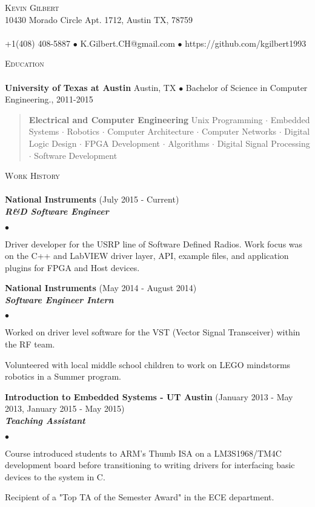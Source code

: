 \documentclass[11pt]{article}
\newcommand{\area}[2]{\vspace*{-9pt} \begin{verse}\textbf{#1}   #2 \end{verse}  }
\newcommand{\lineunder}{\vspace*{-8pt} \\ \hspace*{-18pt} \hrulefill \\}
\newcommand{\header}[1]{{\hspace*{-10pt}\vspace*{6pt} \textsc{#1}} \vspace*{-6pt} \lineunder}
\newcommand{\employer}[3]{{ \textbf{#1} (#2)\\ \textbf{\emph{#3}}}\\  }
\newcommand{\contact}[3]{
\vspace*{-8pt}
\begin{center}
{\LARGE \scshape {#1}}\\
#2 \lineunder 
#3
\end{center}
\vspace*{-8pt}
}
\newenvironment{achievements}{\begin{list}{$\bullet$}{\topsep 0pt \itemsep -2pt}}{\vspace*{4pt}\end{list}}
\newcommand{\schoolwithcourses}[4]{
 \textbf{#1} #2 $\bullet$ #3\\ 
\vspace*{5pt}
}
\begin{document}
\small
\smallskip
\vspace*{-30pt}

\contact{Kevin Gilbert}
{10430 Morado Circle Apt. 1712, Austin TX, 78759}
{+1(408) 408-5887 $\bullet$ K.Gilbert.CH@gmail.com  $\bullet$ https://github.com/kgilbert1993}

\header{Education}

\schoolwithcourses{University of Texas at Austin}{Austin, TX}{Bachelor of Science in Computer Engineering., 2011-2015}
{Cumulative GPA: 3.33/4.00}
	\area{Electrical and Computer Engineering}{ Unix Programming $\cdot$ Embedded Systems $\cdot$ Robotics $\cdot$ Computer Architecture $\cdot$ Computer Networks $\cdot$ Digital Logic Design $\cdot$ FPGA Development $\cdot$
 Algorithms $\cdot$ Digital Signal Processing $\cdot$ Software Development}

\header{Work History}
\employer{National Instruments}{July 2015 - Current}{R\&D Software Engineer}
	\begin{achievements}
	\item Driver developer for the USRP line of Software Defined Radios. Work focus was on the C++ and LabVIEW driver layer, API, example files, and application plugins for FPGA and Host devices.
    \end{achievements}
\employer{National Instruments}{May 2014 - August 2014}{Software Engineer Intern}
	\begin{achievements}
	\item Worked on driver level software for the VST (Vector Signal Transceiver) within the RF team.
    \item Volunteered with local middle school children to work on LEGO mindstorms robotics in a Summer program.
	\end{achievements}
    
\employer{Introduction to Embedded Systems - UT Austin}{January 2013 - May 2013, January 2015 - May 2015} {Teaching Assistant}
	\begin{achievements}
	\item Course introduced students to ARM’s Thumb ISA on a LM3S1968/TM4C development board before transitioning to writing drivers for interfacing basic devices to the system in C.
	\item Recipient of a "Top TA of the Semester Award" in the ECE department.
	\end{achievements}
\end{document}
